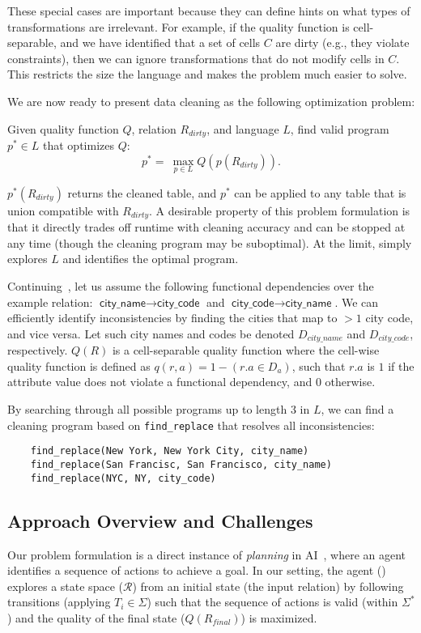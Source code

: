 These special cases are important because they can define hints on what types of transformations are irrelevant.
For example, if the quality function is cell-separable, and we have identified that a set of cells $C$ are dirty (e.g., they violate constraints), then we can ignore transformations that do not modify cells in $C$.  This restricts the size the language and makes the problem much easier to solve.


\noindent We are now ready to present data cleaning as the following optimization problem:
\begin{problem}
Given quality function $Q$, relation $R_{dirty}$, and language $L$, find valid program $p^* \in L$ that optimizes $Q$:
\[
p^* = ~ \max_{p \in L} Q( p(R_{dirty}) ).  
\]
\end{problem}
$p^*(R_{dirty})$ returns the cleaned table, and $p^*$ can be applied to any table that is union compatible with $R_{dirty}$.
A desirable property of this problem formulation is that it directly trades off runtime with cleaning accuracy and can be stopped at any time (though the cleaning program may be suboptimal).  At the limit, \sys simply explores $L$ and identifies the optimal program.


\begin{example}\label{ex3}
Continuing~, let us assume the following functional dependencies over the example relation: $\textsf{city\_name} \rightarrow \textsf{city\_code}$ and $\textsf{city\_code} \rightarrow \textsf{city\_name}$.
We can efficiently identify inconsistencies by finding the cities that map to $>1$ city code, and vice versa.   Let such city names and codes be denoted $D_{city\_name}$ and $D_{city\_code}$, respectively.
$Q(R)$ is a cell-separable quality function where the cell-wise quality function is defined as $q(r, a) = 1 - (r.a \in D_a)$, such that $r.a$ is $1$ if the attribute value does not violate a functional dependency, and $0$ otherwise.

By searching through all possible programs up to length 3 in $L$, we can find a cleaning program based on \texttt{find\_replace} that resolves all inconsistencies:
\begin{lstlisting}
    find_replace(New York, New York City, city_name)
    find_replace(San Francisc, San Francisco, city_name)
    find_replace(NYC, NY, city_code)
\end{lstlisting}
\end{example}

\subsection{Approach Overview and Challenges}
Our problem formulation is a direct instance of {\it planning} in AI~\cite{russell1995modern}, where an agent identifies a sequence of actions to achieve a goal.  In our setting, the agent (\sys) explores a state space ($\mathcal{R}$) from an initial state (the input relation) by following transitions (applying $T_i \in \Sigma$) such that the sequence of actions is valid (within $\Sigma^*$) and the quality of the final state ($Q(R_{final})$) is maximized.  

